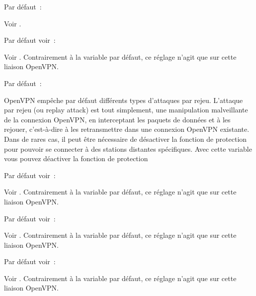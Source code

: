 \begin{description}
  Par défaut~: 

  Voir .


  Par défaut voir~: 

  Voir . Contrairement à
  la variable par défaut, ce réglage n'agit que sur cette liaison OpenVPN.


  Par défaut~: 

  OpenVPN empêche par défaut différents types d'attaques par rejeu.
  L'attaque par rejeu (ou replay attack) est tout simplement, une
  manipulation malveillante de la connexion OpenVPN, en interceptant
  les paquets de données et à les rejouer, c'est-à-dire à les retransmettre
  dans une connexion OpenVPN existante. Dans de rares cas, il peut être nécessaire
  de désactiver la fonction de protection pour pouvoir se connecter à des
  stations distantes spécifiques. Avec cette variable vous pouvez déactiver
  la fonction de protection



  Par défaut voir~: 

  Voir . Contrairement
  à la variable par défaut, ce réglage n'agit que sur cette liaison OpenVPN.


  Par défaut voir~: 

  Voir . Contrairement
  à la variable par défaut, ce réglage n'agit que sur cette liaison OpenVPN.


  Par défaut voir~: 

  Voir .
  Contrairement à la variable par défaut, ce réglage n'agit que sur cette liaison OpenVPN.


\end{description}
